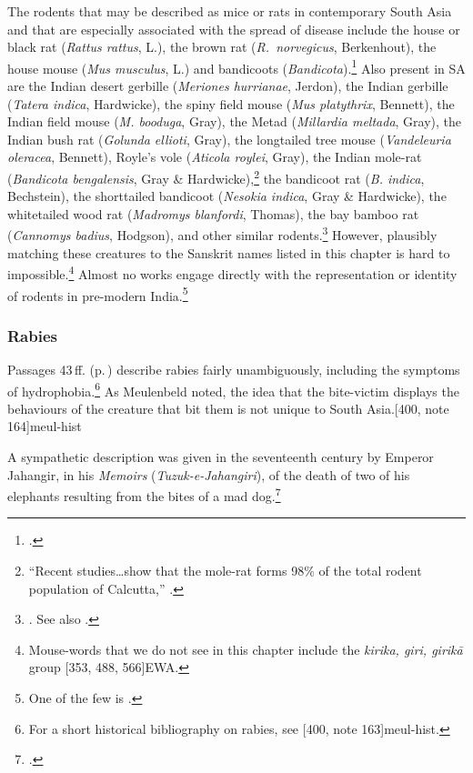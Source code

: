 The rodents that may be described as mice or rats in contemporary
South Asia and that are especially associated with the spread of
disease include the house or black rat (\emph{Rattus rattus}, L.),
the brown rat (\emph{R.\ norvegicus}, Berkenhout), the house mouse
(\emph{Mus musculus}, L.) and bandicoots
(\emph{Bandicota}).\footcite[194]{bia} Also present in SA are the
Indian desert gerbille (\emph{Meriones hurrianae}, Jerdon), the
Indian gerbille (\emph{Tatera indica}, Hardwicke), the spiny field
mouse (\emph{Mus platythrix}, Bennett), the Indian field mouse
(\emph{M. booduga}, Gray), the Metad (\emph{Millardia meltada},
Gray), the Indian bush rat (\emph{Golunda ellioti}, Gray), the
longtailed tree mouse (\emph{Vandeleuria oleracea}, Bennett), Royle's
vole (\emph{Aticola roylei}, Gray), the Indian mole-rat
(\emph{Bandicota bengalensis}, Gray \& Hardwicke),\footnote{“Recent
    studies\ldots show that the mole-rat forms 98\% of the total rodent
    population of Calcutta,” \cite[206]{bia}.} the bandicoot rat
    (\emph{B. indica}, Bechstein), the shorttailed bandicoot
    (\emph{Nesokia indica}, Gray \& Hardwicke), the whitetailed wood rat
    (\emph{Madromys blanfordi}, Thomas), the bay bamboo rat
    (\emph{Cannomys badius}, Hodgson), and other similar
    rodents.\footnote{\cite[ill.\ plates \,45, 46 \emph{et passim}]{bia}.
        See also \cite[passim]{meno-2014}.} However, plausibly matching
        these creatures to the Sanskrit names listed in this chapter is hard
        to impossible.\footnote{Mouse-words that we do not see in this
            chapter include the \emph{kirika, giri, girikā} group
            [353, 488, 566]{EWA}.}  Almost no works engage directly
            with the representation or identity of rodents in pre-modern
            India.\footnote{One of the few is \cite[ch.\,3]{geer-2008}.}


\subsubsection{Rabies}

Passages 43\,ff. (p.\,\pageref{rabies}) describe rabies fairly unambiguously, 
including the symptoms of hydrophobia.\footnote{For a short historical 
bibliography on rabies, see [400, note 
163]{meul-hist}.}  As Meulenbeld noted, the idea that the bite-victim displays the 
behaviours of the creature that bit them is not unique to South 
Asia.[400, note 164]{meul-hist}


A sympathetic description was given in the seventeenth century by
Emperor Jahangir, in his \emph{Memoirs} (\emph{Tuzuk-e-Jahangiri}),
of the death of two of his elephants resulting from the bites of a
mad dog.\footcites[132--134]{alvi-1968}[145--146]{thac-1999}


